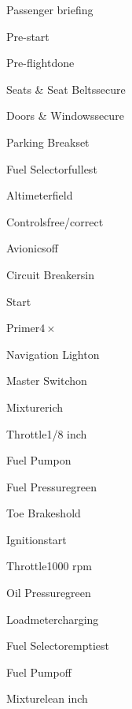 





\begin{multicols}{2}
\begin{checklist}{Passenger briefing}
\end{checklist}

\begin{checklist}{Pre-start}
    \item{Pre-flight}{done}
    \item{Seats \& Seat Belts}{secure}
    \item{Doors \& Windows}{secure}
    \item{Parking Break}{set}
    \item{Fuel Selector}{fullest}
    \item{Altimeter}{field}
    \item{Controls}{free/correct}
    \item{Avionics}{off}
    \item{Circuit Breakers}{in}
\end{checklist}

\begin{checklist}{Start}
    \item{Primer}{$4\times$}
    \item{Navigation Light}{on}
    \item{Master Switch}{on}
    \item{Mixture}{rich}
    \item{Throttle}{1/8 inch}
    \item{Fuel Pump}{on}
    \item{Fuel Pressure}{green}
    \item{Toe Brakes}{hold}
    \item{Ignition}{start}
    \item{Throttle}{1000 rpm}
    \item{Oil Pressure}{green}
    \item{Loadmeter}{charging}
    \item{Fuel Selector}{emptiest}
    \item{Fuel Pump}{off}
    \item{Mixture}{lean  inch}
\end{checklist}


\end{multicols}
